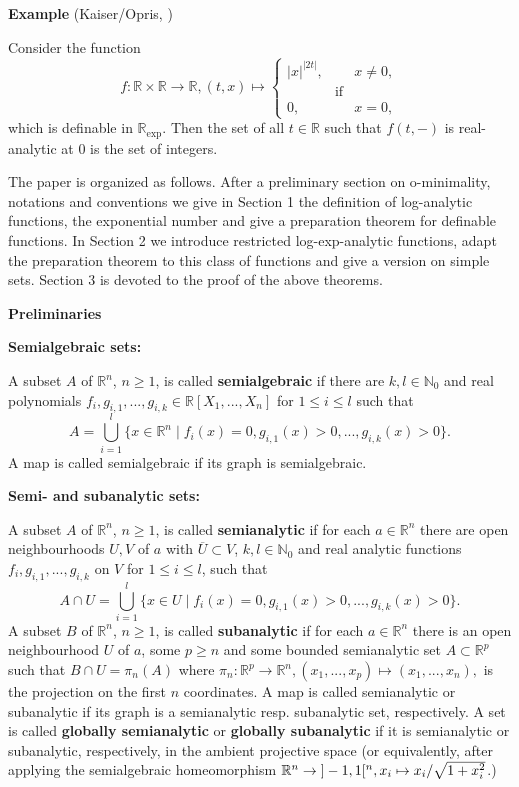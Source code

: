 \documentclass[12pt]{article}
\def\vs{\vspace}
\def\exp{\mathrm{exp}}
\begin{document}
\vs{0.5cm}
{\bf Example} (Kaiser/Opris, \cite{7})

\vs{0.1cm}
Consider the function 
$$f: \mathbb{R} \times \mathbb{R} \to \mathbb{R},
(t,x)\mapsto 
\left\{\begin{array}{lll}| {x} |^{|2t|},&& x \neq 0, \\
&\mbox{if}&\\
0,&& x=0,
\end{array}\right.$$
which is definable in $\mathbb{R}_{\exp}$. Then the set of all $t \in \mathbb{R}$ such that $f(t,-)$ is real-analytic at $0$ is the set of integers. 

\vs{0.5cm}
The paper is organized as follows. After a preliminary section on o-minimality, notations and conventions we give in Section 1 the definition of log-analytic functions, the exponential number and give a preparation theorem for definable functions. In Section 2 we introduce restricted log-exp-analytic functions, adapt the preparation theorem to this class of functions and give a version on simple sets. Section 3 is devoted to the proof of the above theorems.

\vs{0.8cm}
{\Large\bf Preliminaries}

\vs{0.3cm}
{\bf Semialgebraic sets:}

\vs{0.1cm}
A subset $A$ of $\mathbb{R}^n$, $n \geq 1$, is called \textbf{semialgebraic} if there are $k,l \in \mathbb{N}_0$ and real polynomials $f_i,g_{i,1},...,g_{i,k} \in \mathbb{R}[X_1,...,X_n]$ for $1 \leq i \leq l$ such that 
$$A = \bigcup_{i=1}^l \{x \in \mathbb{R}^n \mid f_i(x)=0, g_{i,1}(x)>0,...,g_{i,k}(x)>0\}.$$
A map is called semialgebraic if its graph is semialgebraic.

\vs{0.3cm}
{\bf Semi- and subanalytic sets:}

\vs{0.1cm}
A subset $A$ of $\mathbb{R}^n$, $n \geq 1$, is called \textbf{semianalytic} if for each $a \in \mathbb{R}^n$ there are open neighbourhoods $U,V$ of $a$ with $\overline{U} \subset V$, $k,l \in \mathbb{N}_0$ and real analytic functions $f_i,g_{i,1},...,g_{i,k}$ on $V$ for $1 \leq i \leq l$, such that
$$A \cap U = \bigcup_{i=1}^l\{x \in U \mid f_i(x)=0, g_{i,1}(x)>0,...,g_{i,k}(x)>0\}.$$
A subset $B$ of $\mathbb{R}^n$, $n \geq 1$, is called \textbf{subanalytic} if for each $a \in \mathbb{R}^n$ there is an open neighbourhood $U$ of $a$, some $p \geq n$ and some bounded semianalytic set $A \subset \mathbb{R}^p$ such that $B \cap U=\pi_n(A)$ where $\pi_n:\mathbb{R}^p \to \mathbb{R}^n, (x_1,...,x_p) \mapsto (x_1,...,x_n),$ is the projection on the first $n$ coordinates.
A map is called semianalytic or subanalytic if its graph is a semianalytic resp. subanalytic set, respectively. A set is called \textbf{globally semianalytic} or \textbf{globally subanalytic} if it is semianalytic or subanalytic, respectively, in the ambient projective space (or equivalently, after applying the semialgebraic homeomorphism $\mathbb{R}^n \to \textnormal{}]-1,1[^n, x_i \mapsto x_i/\sqrt{1+x_i^2}$.)
\end{document}
